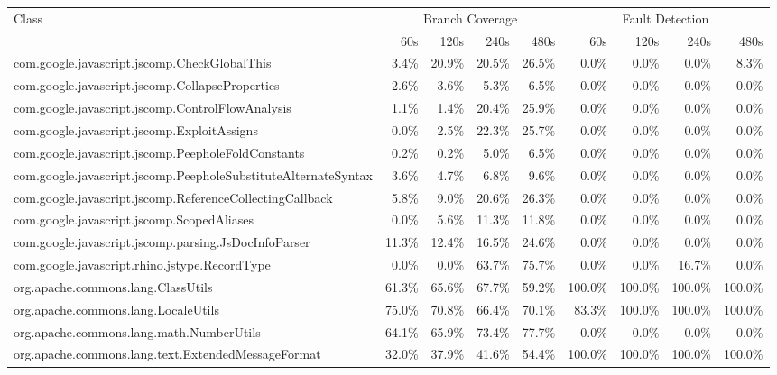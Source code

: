 \begin{tabular}{ l rrrr rrrr}\toprule 
 Class &  \multicolumn{4}{c}{Branch Coverage}  &  \multicolumn{4}{c}{Fault Detection} \\ 
 & 60s & 120s & 240s & 480s & 60s & 120s & 240s & 480s \\ 
\midrule 
com.google.javascript.jscomp.CheckGlobalThis &  3.4\% &  20.9\% &  20.5\% &  26.5\% &  0.0\% &  0.0\% &  0.0\% &  8.3\%\\ 
com.google.javascript.jscomp.CollapseProperties &  2.6\% &  3.6\% &  5.3\% &  6.5\% &  0.0\% &  0.0\% &  0.0\% &  0.0\%\\ 
com.google.javascript.jscomp.ControlFlowAnalysis &  1.1\% &  1.4\% &  20.4\% &  25.9\% &  0.0\% &  0.0\% &  0.0\% &  0.0\%\\ 
com.google.javascript.jscomp.ExploitAssigns &  0.0\% &  2.5\% &  22.3\% &  25.7\% &  0.0\% &  0.0\% &  0.0\% &  0.0\%\\ 
com.google.javascript.jscomp.PeepholeFoldConstants &  0.2\% &  0.2\% &  5.0\% &  6.5\% &  0.0\% &  0.0\% &  0.0\% &  0.0\%\\ 
com.google.javascript.jscomp.PeepholeSubstituteAlternateSyntax &  3.6\% &  4.7\% &  6.8\% &  9.6\% &  0.0\% &  0.0\% &  0.0\% &  0.0\%\\ 
com.google.javascript.jscomp.ReferenceCollectingCallback &  5.8\% &  9.0\% &  20.6\% &  26.3\% &  0.0\% &  0.0\% &  0.0\% &  0.0\%\\ 
com.google.javascript.jscomp.ScopedAliases &  0.0\% &  5.6\% &  11.3\% &  11.8\% &  0.0\% &  0.0\% &  0.0\% &  0.0\%\\ 
com.google.javascript.jscomp.parsing.JsDocInfoParser &  11.3\% &  12.4\% &  16.5\% &  24.6\% &  0.0\% &  0.0\% &  0.0\% &  0.0\%\\ 
com.google.javascript.rhino.jstype.RecordType &  0.0\% &  0.0\% &  63.7\% &  75.7\% &  0.0\% &  0.0\% &  16.7\% &  0.0\%\\ 
org.apache.commons.lang.ClassUtils &  61.3\% &  65.6\% &  67.7\% &  59.2\% &  100.0\% &  100.0\% &  100.0\% &  100.0\%\\ 
org.apache.commons.lang.LocaleUtils &  75.0\% &  70.8\% &  66.4\% &  70.1\% &  83.3\% &  100.0\% &  100.0\% &  100.0\%\\ 
org.apache.commons.lang.math.NumberUtils &  64.1\% &  65.9\% &  73.4\% &  77.7\% &  0.0\% &  0.0\% &  0.0\% &  0.0\%\\ 
org.apache.commons.lang.text.ExtendedMessageFormat &  32.0\% &  37.9\% &  41.6\% &  54.4\% &  100.0\% &  100.0\% &  100.0\% &  100.0\%\\ 

\end{tabular}
